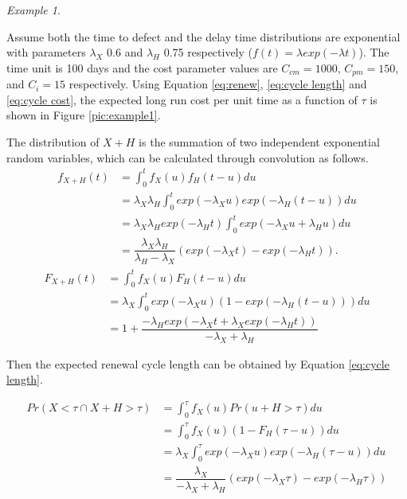 \documentclass[10pt,a4paper]{article}
\theoremstyle{remark}
\newtheorem{example}{Example}
\begin{document}
\begin{example} \label{ex:DTM1} \renewcommand{\qedsymbol}{$\lozenge$} \mbox{} 

Assume both the time to defect and the delay time distributions are exponential with parameters $\lambda_{X}$ 0.6 and $\lambda_{H}$ 0.75 respectively ($f(t)=\lambda exp (-\lambda t)$). The time unit is 100 days and the cost parameter values are $C_{cm}=1000$, $C_{pm}=150$, and $C_{i}=15$ respectively. Using Equation \ref{eq:renew}, \ref{eq:cycle length} and \ref{eq:cycle cost}, the expected long run cost per unit time as a function of $\tau$ is shown in Figure \ref{pic:example1}.

The distribution of $X+H$ is the summation of two independent exponential random variables, which can be calculated through convolution as follows.
\begin{align}
f_{X+H}(t) & =\int_{0}^{t}f_{X}(u)f_{H}(t-u)du \nonumber \\
& = \lambda_{X} \lambda_{H} \int_{0}^{t} exp(-\lambda_{X} u) exp(-\lambda_{H} (t-u)) du \nonumber \\
& = \lambda_{X} \lambda_{H} exp(-\lambda_{H} t) \int_{0}^{t} exp(-\lambda_{X} u+\lambda_{H}u) du \nonumber \\
& = \dfrac{\lambda_{X} \lambda_{H}}{\lambda_{H}-\lambda_{X}}(exp(-\lambda_{X} t)-exp(-\lambda_{H}t)). 
\end{align}
\begin{align}
F_{X+H}(t) & =\int_{0}^{t}f_{X}(u)F_{H}(t-u)du \nonumber \\
& =  \lambda_{X}\int_{0}^{t} exp(-\lambda_{X}u) (1-exp(-\lambda_{H}(t-u))) du \nonumber \\
& = 1+\dfrac{-\lambda_{H}exp(-\lambda_{X}t+\lambda_{X}exp(-\lambda_{H}t))}{-\lambda_{X}+\lambda_{H}}
\end{align}

Then the expected renewal cycle length can be obtained by Equation \ref{eq:cycle length}.

\begin{align}
Pr(X<\tau \cap X+H>\tau) & = \int_{0}^{\tau} f_{X}(u) Pr(u+H>\tau)du \nonumber \\  
& = \int_{0}^{\tau} f_{X}(u) (1-F_{H}(\tau-u))du \nonumber \\
& = \lambda_{X}\int_{0}^{\tau} exp(-\lambda_{X}u) exp(-\lambda_{H}(\tau-u)) du \nonumber \\
& = \dfrac{\lambda_{X}}{-\lambda_{X}+\lambda_{H}}(exp(-\lambda_{X}\tau)-exp(-\lambda_{H}\tau))
\end{align}


\end{example}
\end{document}

